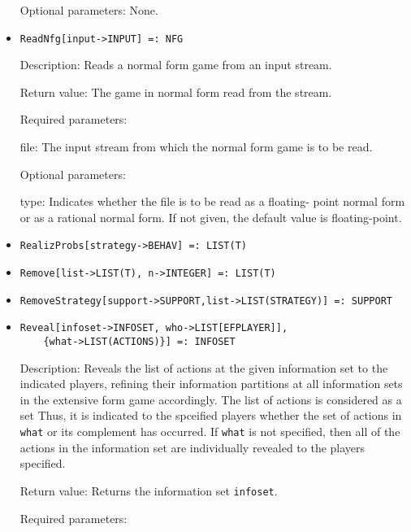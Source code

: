 \begin{itemize}
\item
[Optional parameters:] None.\hfil\null
\ed

\item
\protect \large \begin{verbatim}
ReadNfg[input->INPUT] =: NFG
\end{verbatim}\normalsize
\bd
\item
[Description:] Reads a normal form game from an input stream.  
\item
[Return value:] The game in normal form read from the stream.
\item
[Required parameters:]\hfil\null

\bd
\item
[file:] The input stream from which the normal form game is to be
read.  
\ed

\item
[Optional parameters:]\hfil\null
\bd

\item
[type:] Indicates whether the file is to be read as a floating- point
normal form or as a rational normal form.  If not given, the default
value is floating-point.
\ed
\ed

\item
\protect \large \begin{verbatim}
RealizProbs[strategy->BEHAV] =: LIST(T)
\end{verbatim}\normalsize

\item
\protect \large \begin{verbatim}
Remove[list->LIST(T), n->INTEGER] =: LIST(T)
\end{verbatim}\normalsize

\item
\protect \large \begin{verbatim}
RemoveStrategy[support->SUPPORT,list->LIST(STRATEGY)] =: SUPPORT
\end{verbatim}\normalsize

\item
\protect \large \begin{verbatim}
Reveal[infoset->INFOSET, who->LIST[EFPLAYER]], 
	{what->LIST(ACTIONS)}] =: INFOSET
\end{verbatim}\normalsize

\bd
\item
[Description:] Reveals the list of actions at the given information
set to the indicated players, refining their information partitions at
all information sets in the extensive form game accordingly.  The list
of actions is considered as a set Thus, it is indicated to the
spceified players whether the set of actions in \verb+what+ or its
complement has occurred.  If \verb+what+ is not specified, then all of
the actions in the information set are individually revealed to
the players specified.  
\item
[Return value:] Returns the information set \verb+infoset+.
\item
[Required parameters:]\hfil\null
	

\end{itemize}
